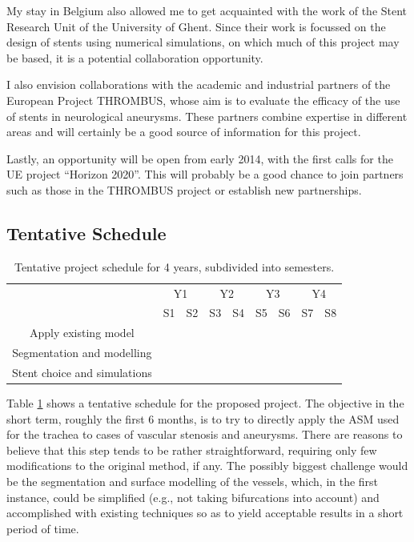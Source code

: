 \documentclass[a4paper]{article}
\begin{document}
My stay in Belgium also allowed me to get acquainted with the work of the Stent Research Unit of the University of Ghent. Since their work is focussed on the design of stents using numerical simulations, on which much of this project may be based, it is a potential collaboration opportunity. 

I also envision collaborations with the academic and industrial partners of the European Project THROMBUS, whose aim is to evaluate the efficacy of the use of stents in neurological aneurysms. These partners combine expertise in different areas and will certainly be a good source of information for this project.

Lastly, an opportunity will be open from early 2014, with the first calls for the UE project ``Horizon 2020''. This will probably be a good chance to join partners such as those in the THROMBUS project or establish new partnerships. 

\subsection{Tentative Schedule}

\begin{table}[h]\centering
\begin{tabular}{c|c|c|c|c|c|c|c|c|}
\cline{2-9}
 & \multicolumn{2}{|c|}{Y1} & \multicolumn{2}{|c|}{Y2} & \multicolumn{2}{|c|}{Y3} & \multicolumn{2}{|c|}{Y4} \\ \cline{2-9}
 & S1 & S2 & S3 & S4 & S5 & S6 & S7 & S8  \\ \hline
\multicolumn{1}{|c|}{Apply existing model} & \cellcolor{green} & & & & & & & \\ \hline
\multicolumn{1}{|c|}{Segmentation and modelling} & & \cellcolor{green} & \cellcolor{green} & \cellcolor{green} & & & & \\ \hline
\multicolumn{1}{|c|}{Stent choice and simulations} & & & & & \cellcolor{green} & \cellcolor{green} & \cellcolor{green} & \cellcolor{green} \\ \hline
\end{tabular}
\caption{Tentative project schedule for 4 years, subdivided into semesters.}
\label{tab:schedule}
\end{table}

Table \ref{tab:schedule} shows a tentative schedule for the proposed project. The objective in the short term, roughly the first 6 months, is to try to directly apply the ASM used for the trachea to cases of vascular stenosis and aneurysms. There are reasons to believe that this step tends to be rather straightforward, requiring only few modifications to the original method, if any. The possibly biggest challenge would be the segmentation and surface modelling of the vessels, which, in the first instance, could be simplified (e.g., not taking bifurcations into account) and accomplished with existing techniques so as to yield acceptable results in a short period of time. 
\end{document}
